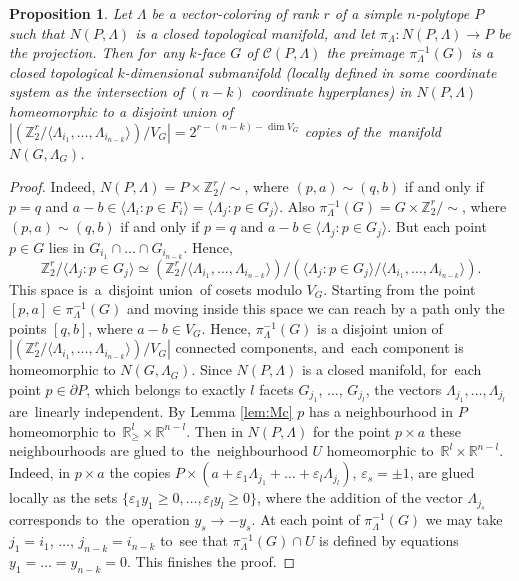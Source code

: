 \documentclass[12pt]{amsart}
\newtheorem{proposition}[formula]{Proposition}
\theoremstyle{definition}
\theoremstyle{remark}
\begin{document}
\begin{proposition}\label{prop:Gk}
Let $\Lambda$ be a vector-coloring of rank $r$ of a simple $n$-polytope $P$ such that 
$N(P,\Lambda)$ is a closed topological manifold, and let 
$\pi_{\Lambda}\colon N(P,\Lambda)\to P$ be the projection. 
Then for~any $k$-face $G$ of $\mathcal{C}(P,\Lambda)$ the preimage $\pi_{\Lambda}^{-1}(G)$
is a closed topological $k$-dimensional submanifold (locally defined in some coordinate system
as the intersection of $(n-k)$ coordinate hyperplanes) in $N(P,\Lambda)$ homeomorphic to 
a disjoint union of $|\left(\mathbb Z_2^r/\langle \Lambda_{i_1},\dots,\Lambda_{i_{n-k}}\rangle\right)/V_G|=2^{r-(n-k)-\dim V_G}$
copies of the~manifold $N(G,\Lambda_G)$.
\end{proposition}
\begin{proof}
Indeed, $N(P,\Lambda)=P\times \mathbb Z_2^r/\sim$,  where $(p,a)\sim(q,b)$  if and only if $p=q$  and 
$a-b\in\langle \Lambda_i\colon p\in F_i\rangle=\langle \Lambda_j\colon p\in G_j\rangle$.
Also $\pi_{\Lambda}^{-1}(G)=G\times \mathbb Z_2^r/\sim$, where $(p,a)\sim(q,b)$  if and only if $p=q$  and 
$a-b\in\langle \Lambda_j\colon p\in G_j\rangle$. But each point $p\in G$ lies in $G_{i_1}\cap\dots\cap G_{i_{n-k}}$. Hence,
$$
\mathbb Z_2^r/\langle\Lambda_j\colon p\in G_j\rangle\simeq 
(\mathbb Z_2^r/\langle \Lambda_{i_1},\dots,\Lambda_{i_{n-k}}\rangle)/
(\langle \Lambda_j\colon p\in G_j\rangle/\langle \Lambda_{i_1},\dots,\Lambda_{i_{n-k}}\rangle).
$$
This space is~a~disjoint union~of cosets modulo  $V_G$. Starting from the point  $[p,a]\in \pi_{\Lambda}^{-1}(G)$
and moving inside this space we can reach by a path only the points $[q,b]$, where $a-b\in V_G$. Hence, 
$\pi_{\Lambda}^{-1}(G)$ is a disjoint union of 
$|\left(\mathbb Z_2^r/\langle \Lambda_{i_1},\dots,\Lambda_{i_{n-k}}\rangle\right)/V_G|$ connected
components, and~each component is homeomorphic to $N(G,\Lambda_G)$. Since $N(P,\Lambda)$
is a closed manifold, for~each point $p\in \partial P$, which 
belongs to exactly $l$ facets $G_{j_1}$, $\dots$, $G_{j_l}$, the vectors  $\Lambda_{j_1},\dots, \Lambda_{j_l}$ are~linearly
independent. By Lemma \ref{lem:Mc} $p$ has a neighbourhood in $P$ homeomorphic 
to~$\mathbb R^l_{\geqslant}\times\mathbb R^{n-l}$.
Then in $N(P,\Lambda)$ for the point $p\times a$ these neighbourhoods are glued to~the~neighbourhood $U$ 
homeomorphic to~$\mathbb R^l\times \mathbb R^{n-l}$. Indeed, in $p\times a$ the copies $P\times (a+\varepsilon_1\Lambda_{j_1}+
\dots+\varepsilon_l\Lambda_{j_l})$, $\varepsilon_s=\pm1$, are glued locally as the sets 
$\{\varepsilon_1y_1\geqslant 0,\dots, \varepsilon_ly_l\geqslant 0\}$,  where the addition of the vector $\Lambda_{j_s}$ corresponds to~the~operation $y_s\to -y_s$.  At each point of  $\pi_{\Lambda}^{-1}(G)$ we may take $j_1=i_1$, $\dots$, $j_{n-k}=i_{n-k}$
to~see that $\pi_{\Lambda}^{-1}(G)\cap U$ is defined by equations $y_1=\dots=y_{n-k}=0$. This finishes the proof.
\end{proof}
\end{document}
